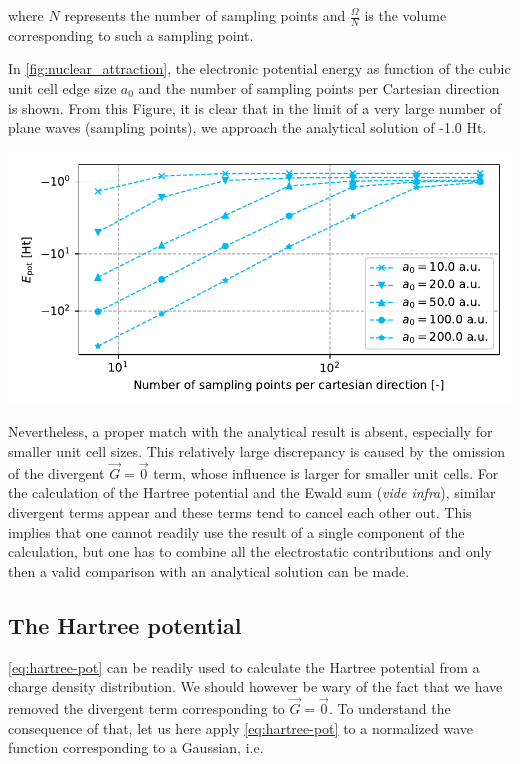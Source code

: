 where $N$ represents the number of sampling points and $\frac{\Omega}{N}$ is the volume corresponding to such a sampling point.

In \cref{fig:nuclear_attraction}, the electronic potential energy as function of the cubic unit cell edge size $a_{0}$ and the number of sampling points per Cartesian direction is shown. From this Figure, it is clear that in the limit of a very large number of plane waves (sampling points), we approach the analytical solution of -1.0 Ht.

\begin{Figure}
    \centering
    \includegraphics[width=\linewidth]{img/fig5_nuclear_attraction.pdf}
    \label{fig:nuclear_attraction}
\end{Figure}

Nevertheless, a proper match with the analytical result is absent, especially for smaller unit cell sizes. This relatively large discrepancy is caused by the omission of the divergent $\vec{G}=\vec{0}$ term, whose influence is larger for smaller unit cells. For the calculation of the Hartree potential and the Ewald sum (\textit{vide infra}), similar divergent terms appear and these terms tend to cancel each other out. This implies that one cannot readily use the result of a single component of the calculation, but one has to combine all the electrostatic contributions and only then a valid comparison with an analytical solution can be made.

%
%
%
\subsection{The Hartree potential}

\cref{eq:hartree-pot} can be readily used to calculate the Hartree potential from a charge density distribution. We should however be wary of the fact that we have removed the divergent term corresponding to $\vec{G} = \vec{0}$. To understand the consequence of that, let us here apply \cref{eq:hartree-pot} to a normalized wave function corresponding to a Gaussian, i.e.

